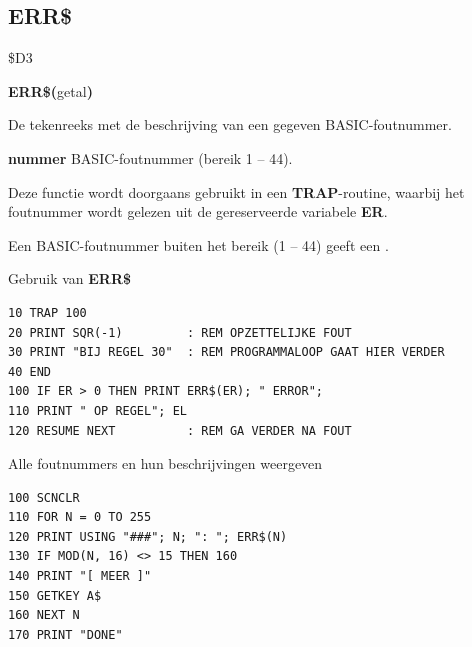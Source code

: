 \subsection{ERR\$}
\begin{description}[leftmargin=2cm,style=nextline]
\item [Token:]    \$D3

\item [Formaat:]   {\bf ERR\$(}getal{\bf)}

\item [Retourneert:]  De tekenreeks met de beschrijving van een gegeven BASIC-foutnummer.

                  {\bf nummer} BASIC-foutnummer (bereik 1 -- 44).

                  Deze functie wordt doorgaans gebruikt in een {\bf TRAP}-routine, waarbij het foutnummer wordt gelezen uit de gereserveerde variabele {\bf ER}.

\item [Opmerkingen:]  Een BASIC-foutnummer buiten het bereik (1 -- 44) geeft een .

\item [Voorbeelden:] Gebruik van {\bf ERR\$}

\begin{tcolorbox}[colback=black,coltext=white]
\verbatimfont{\codefont}
\begin{verbatim}
10 TRAP 100
20 PRINT SQR(-1)         : REM OPZETTELIJKE FOUT
30 PRINT "BIJ REGEL 30"  : REM PROGRAMMALOOP GAAT HIER VERDER
40 END
100 IF ER > 0 THEN PRINT ERR$(ER); " ERROR";
110 PRINT " OP REGEL"; EL
120 RESUME NEXT          : REM GA VERDER NA FOUT
\end{verbatim}
\end{tcolorbox}

                  Alle foutnummers en hun beschrijvingen weergeven

\begin{tcolorbox}[colback=black,coltext=white]
\verbatimfont{\codefont}
\begin{verbatim}
100 SCNCLR
110 FOR N = 0 TO 255
120 PRINT USING "###"; N; ": "; ERR$(N)
130 IF MOD(N, 16) <> 15 THEN 160
140 PRINT "[ MEER ]"
150 GETKEY A$
160 NEXT N
170 PRINT "DONE"
\end{verbatim}
\end{tcolorbox}
\end{description}



